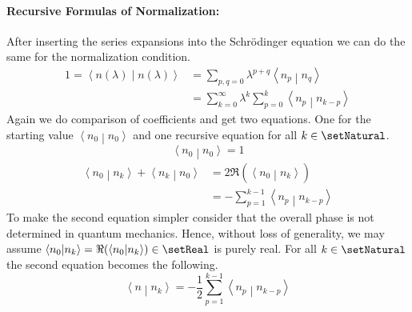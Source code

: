 \documentclass[10pt,fleqn]{article}
\newcommand{\bracket}[2]{\left\langle #1 \middle\vert #2 \right\rangle}
\begin{document}
\begin{multicols}{2}
      \paragraph{Recursive Formulas of Normalization:}
      After inserting the series expansions into the Schrödinger equation we can do the same for the normalization condition.
      \[
        \begin{aligned}
          1 = \bracket{n(λ)}{n(λ)}
          &= \sum_{p,q=0} λ^{p+q} \bracket{n_p}{n_q} \\
          &= \sum_{k=0}^\infty λ^k \sum_{p=0}^k \bracket{n_p}{n_{k-p}}
        \end{aligned}
      \]
      Again we do comparison of coefficients and get two equations.
      One for the starting value $\bracket{n_0}{n_0}$ and one recursive equation for all $k\in\setNatural$.
      \[
        \bracket{n_0}{n_0} = 1
      \]
      \begin{align*}
        \bracket{n_0}{n_k} + \bracket{n_k}{n_0}
        &= 2 \Re(\bracket{n_0}{n_k}) \\
        &= -\sum_{p=1}^{k-1} \bracket{n_p}{n_{k-p}}
      \end{align*}
      To make the second equation simpler consider that the overall phase is not determined in quantum mechanics.
      Hence, without loss of generality, we may assume $\bracket{n_0}{n_k}=\Re(\bracket{n_0}{n_k})\in\setReal$ is purely real.
      For all $k\in\setNatural$ the second equation becomes the following.
      \[
          \bracket{n}{n_k} = -\frac{1}{2}\sum_{p=1}^{k-1} \bracket{n_p}{n_{k-p}}
      \]


\end{multicols}
\end{document}
